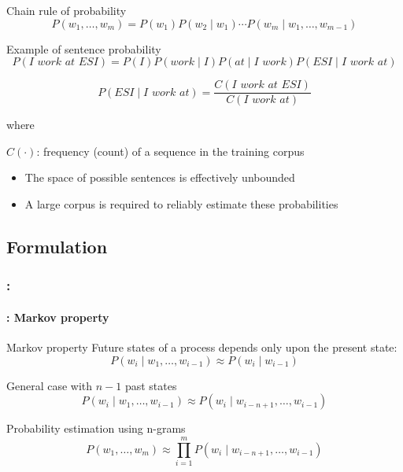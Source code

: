\documentclass[xcolor=table]{beamer}
\begin{document}
\begin{frame}
	\frametitle{\insertshortsubtitle}
	\framesubtitle{\insertsection}
	
	\vspace{-6pt}
	\begin{block}{Chain rule of probability}
		\[
		P(w_1, \ldots, w_m) = P(w_1) P(w_2 \mid w_1) \cdots P(w_m \mid w_1, \ldots, w_{m-1})
		\]
	\end{block}
	
	\vspace{-6pt}
	\begin{exampleblock}{Example of sentence probability}
		\[
		P(\textit{I work at ESI}) = 
		P(\textit{I}) 
		P(\textit{work} \mid \textit{I}) 
		P(\textit{at} \mid \textit{I work}) 
		P(\textit{ESI} \mid \textit{I work at})
		\]
		
		\[
		P(\textit{ESI} \mid \textit{I work at}) =
		\frac{C(\textit{I work at ESI})}{C(\textit{I work at})}
		\]
		
		where 
		
		$C(\cdot)$: frequency (count) of a sequence in the training corpus
	\end{exampleblock}
	
	\begin{itemize}
		\item The space of possible sentences is effectively unbounded
		\item A large corpus is required to reliably estimate these probabilities
	\end{itemize}
	
\end{frame}

\subsection{Formulation}

\begin{frame}
	\frametitle{\insertshortsubtitle: \insertsection}
	\framesubtitle{\insertsubsection: Markov property}

	\begin{block}{Markov property}
		Future states of a process depends only upon the present state:
		\[%
		P(w_i \mid w_1,\ldots, w_{i-1}) \approx P(w_i \mid w_{i-1})
		\]
		
		General case with $n-1$ past states
		\[%
		P(w_i \mid w_1,\ldots, w_{i-1}) \approx P(w_i \mid w_{i-n+1}, \ldots, w_{i-1})
		\]
	\end{block}
	
	\begin{block}{Probability estimation using n-grams}
		\[
		P(w_1,\ldots, w_{m}) \approx \prod_{i=1}^m P(w_i \mid w_{i-n+1}, \ldots, w_{i-1})
		\]
	\end{block}

\end{frame}
\end{document}

